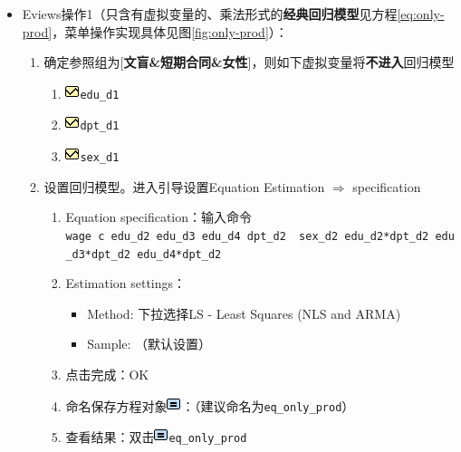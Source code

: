 \documentclass[12pt,(landscape,a4paper),(portrait,a4paper)]{article}
\providecommand{\tightlist}{%
  \setlength{\itemsep}{0pt}\setlength{\parskip}{0pt}}
\theoremstyle{definition}
\theoremstyle{definition}
\theoremstyle{definition}
\theoremstyle{remark}
\begin{document}
\begin{itemize}
\tightlist
\item
  Eviews操作1（只含有虚拟变量的、乘法形式的\textbf{经典回归模型}见方程\eqref{eq:only-prod}，菜单操作实现具体见图\ref{fig:only-prod}）：

  \begin{enumerate}
  \def\labelenumi{\arabic{enumi})}
  \tightlist
  \item
    确定参照组为{[}\textbf{文盲\&短期合同\&女性}{]}，则如下虚拟变量将\textbf{不进入}回归模型

    \begin{enumerate}
    \def\labelenumii{\alph{enumii}.}
    \tightlist
    \item
      \includegraphics{picture/object/Series.png}\texttt{edu\_d1}
    \item
      \includegraphics{picture/object/Series.png}\texttt{dpt\_d1}
    \item
      \includegraphics{picture/object/Series.png}\texttt{sex\_d1}
    \end{enumerate}
  \item
    设置回归模型。进入引导设置Equation Estimation \(\Rightarrow\)
    specification

    \begin{enumerate}
    \def\labelenumii{\alph{enumii}.}
    \tightlist
    \item
      Equation
      specification：输入命令\texttt{wage\ c\ edu\_d2\ edu\_d3\ edu\_d4\ dpt\_d2\ \ sex\_d2\ edu\_d2*dpt\_d2\ edu\_d3*dpt\_d2\ edu\_d4*dpt\_d2}
    \item
      Estimation settings：

      \begin{itemize}
      \tightlist
      \item
        Method: 下拉选择LS - Least Squares (NLS and ARMA)
      \item
        Sample: （默认设置）
      \end{itemize}
    \item
      点击完成：OK
    \item
      命名保存方程对象\includegraphics{picture/object/Equation.png}：（建议命名为\texttt{eq\_only\_prod}）
    \item
      查看结果：双击\includegraphics{picture/object/Equation.png}\texttt{eq\_only\_prod}
    \end{enumerate}
  \end{enumerate}
\end{itemize}
\end{document}
